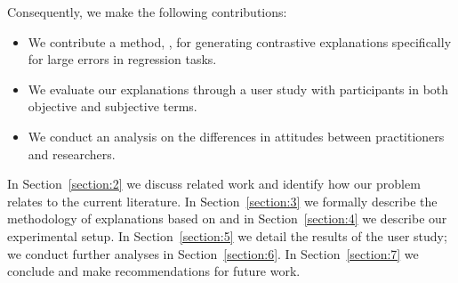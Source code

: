 Consequently, we make the following contributions:
\begin{itemize}
	\item We contribute a method, \OurMethod{}, for generating contrastive explanations specifically for large errors in regression tasks. 
	\item We evaluate our explanations through a user study with  participants in both objective and subjective terms. 
	\item We conduct an analysis on the differences in attitudes between practitioners and researchers.  
\end{itemize}

\noindent
In Section~\ref{section:2} we discuss related work and identify how our problem relates to the current literature. 
In Section~\ref{section:3} we formally describe the methodology of explanations based on \OurMethod{} and in Section~\ref{section:4} we describe our experimental setup. 
In Section~\ref{section:5} we detail the results of the user study; we conduct further analyses in Section~\ref{section:6}. 
In Section~\ref{section:7} we conclude and make recommendations for future work.

